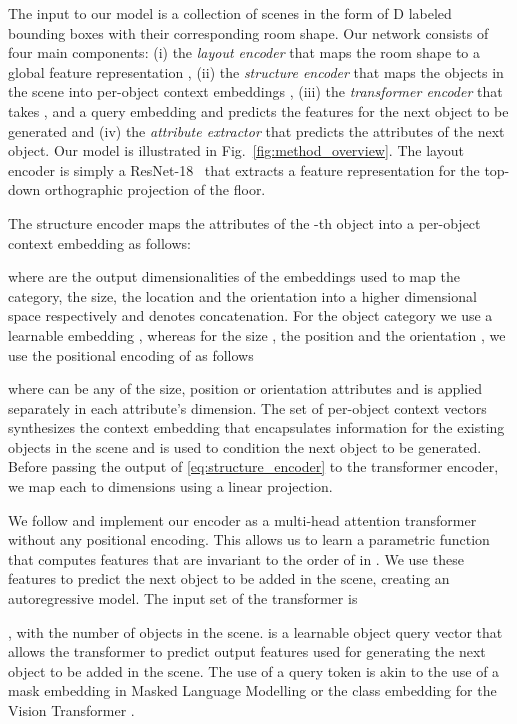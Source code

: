 \documentclass{article}
\newcommand{\boldparagraph}[1]{\vspace{0.2cm}\noindent{\bf #1:} }
\newcommand{\figref}[1]{Fig.~\ref{#1}}
\begin{document}
The input to our model is a collection of scenes in the form of D labeled
bounding boxes with their corresponding room shape. Our network
consists of four main components: (i) the \emph{layout encoder} that maps the
room shape to a global feature representation , (ii) the
\emph{structure encoder}  that maps the  objects in the
scene into per-object context embeddings , (iii) the
\emph{transformer encoder}  that takes ,  and a
query embedding  and predicts the features  for the next object
to be generated and (iv) the \emph{attribute extractor} that predicts the attributes of
the next object. Our model is illustrated in \figref{fig:method_overview}. The
layout encoder is simply a ResNet-18~\cite{He2016CVPR} that extracts
a feature representation  for the top-down orthographic projection of the floor.

\vspace{-2mm}
\boldparagraph{Structure Encoder}The structure encoder  maps the attributes of the -th object into a per-object
context embedding  as follows:

where  are the output dimensionalities of the
embeddings used to map the category, the size, the location and the
orientation into a higher dimensional space respectively and  denotes concatenation.
For the object category  we use a learnable embedding ,
whereas for the size , the position  and the orientation
, we use the positional encoding of \cite{Vaswani2017NIPS} as follows

where  can be any of the size, position or orientation attributes and
 is applied separately in each attribute's dimension.
The set of per-object context vectors synthesizes
the context embedding  that encapsulates information for
the existing objects in the scene and is used to condition the
next object to be generated. Before passing the output of
\eqref{eq:structure_encoder} to the transformer encoder, we map each  to
 dimensions using a linear projection.

\vspace{-2mm}
\boldparagraph{Transformer Encoder}We follow \cite{Vaswani2017NIPS, Devlin2019NAACL} and implement our encoder
 as a multi-head attention transformer without any positional
encoding. This allows us to learn a parametric function that computes features
that are invariant to the order of  in . We use these features to
predict the next object to be added in the scene, creating an
autoregressive model. The input set of the transformer is

, with  the number of
objects in the scene.  is a learnable object
query vector that allows the transformer to predict output features
 used for generating the next
object to be added in the scene.  The use of a query token is akin to the use of a mask
embedding in Masked Language Modelling \cite{Devlin2019NAACL} or the class
embedding for the Vision Transformer \cite{Sharir2021ICLR}.
\end{document}
